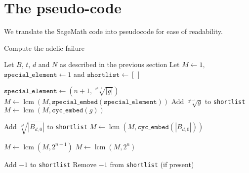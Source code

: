 \documentclass[10pt,a4paper]{report}
\DeclareMathOperator{\lcm}{lcm}
\theoremstyle{definition}
\begin{document}
%
%        
%
%
%
%
\pagebreak

\section*{The pseudo-code}
We translate the SageMath code into pseudocode for ease of readability.

\begin{algorithm}
\caption{Compute the adelic failure}
\begin{algorithmic}
\State Let $B$, $t$, $d$ and $N$ as described in the previous section
\State Let $M\leftarrow1$, $\texttt{special\_element}\leftarrow1$ and $\texttt{shortlist}\leftarrow[\,]$

\State

\State $\texttt{special\_element}\leftarrow(n+1,\sqrt[2^{n-1}]{|g|})$
\State $M\leftarrow\lcm(M,\texttt{special\_embed}(\texttt{special\_element}))$
\Else 
\State Add $\sqrt[2^{n-1}]{g}$ to \texttt{shortlist}
\State $M\leftarrow\lcm(M,\texttt{cyc\_embed}(g))$
\EndIf
\EndFor
\EndIf

\State

\State Add $\sqrt[2^{d}]{|B_{d,0}|}$ to \texttt{shortlist}
\State $M\leftarrow\lcm(M,\texttt{cyc\_embed}(|B_{d,0}|))$
\EndIf

\State
{}
\State $M\leftarrow\lcm(M,2^{n+1})$
\Else
\State $M\leftarrow\lcm(M,2^n)$
\EndIf
\State

\State Add $-1$ to \texttt{shortlist}
\EndIf
\State
{}
\State Remove $-1$ from \texttt{shortlist} (if present)
\EndIf
\State
{}
\end{algorithmic}
\end{algorithm}
\pagebreak
\end{document}
